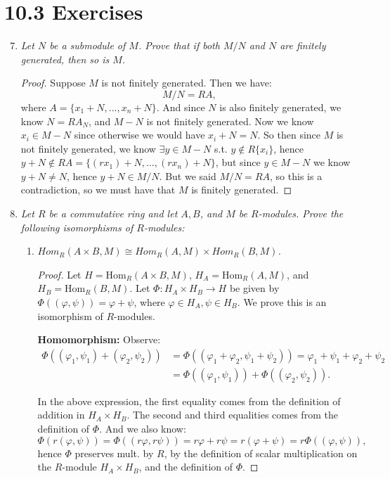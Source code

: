 \documentclass[9pt,reqno,twoside]{amsbook}
\theoremstyle{plain}
\numberwithin{section}{chapter}
\numberwithin{equation}{chapter}
\theoremstyle{definition}
\theoremstyle{remark}
\theoremstyle{plain}
\renewcommand{\phi}{\varphi}
\begin{document}
\section*{10.3 Exercises}
\begin{enumerate}[label=\arabic*.]
\setcounter{enumi}{6}
\item \textit{Let $N$ be a submodule of $M$. Prove that if both $M/N$ and $N$ are finitely generated, then so is $M$. }
\begin{proof}
Suppose $M$ is not finitely generated. Then we have:
$$
M/N = RA,
$$
where $A = \{x_1 + N,...,x_n + N\}$. And since $N$ is also finitely generated, we know $N = RA_N$, and $M -N$ is not finitely generated. 
Now we know $x_i \in M - N$ since otherwise we would have $x_i + N = N$. So then since $M$ is not finitely generated, we know $\exists y \in M - N$ s.t. $y \notin R\{x_i\}$, hence $y + N \notin RA = \{(rx_1) + N,...,(rx_n)+ N\}$, but since $y \in M - N$ we know $y + N \neq N$, hence $y + N \in M/N$. But we said $M/N = RA$, so this is a contradiction, so we must have that $M$ is finitely generated. 
\end{proof}

\setcounter{enumi}{11}
\item \textit{Let $R$ be a commutative ring and let $A,B$, and $M$ be $R$-modules. Prove the following isomorphisms of $R$-modules: }
\begin{enumerate}
\item \textit{$Hom_R(A\times B,M) \cong Hom_R(A,M) \times Hom_R(B,M)$.}
\begin{proof}
Let $H = \text{Hom}_R(A\times B,M)$, $H_A = \text{Hom}_R(A,M)$, and $H_B = \text{Hom}_R(B,M)$. Let $\Phi: H_A \times H_B\to H$ be given by $\Phi((\phi,\psi)) = \phi + \psi$, where $\phi \in H_A,\psi \in H_B$. We prove this is an isomorphism of $R$-modules. 

\textbf{Homomorphism: }Observe: 
\begin{equation}
\begin{aligned}
\Phi((\phi_1,\psi_1) + (\phi_2,\psi_2)) &= \Phi((\phi_1 + \phi_2,\psi_1 + \psi_2)) = \phi_1 + \psi_1 + \phi_2 + \psi_2\\ &= \Phi((\phi_1,\psi_1)) + \Phi((\phi_2,\psi_2)).
\end{aligned}
\end{equation}

In the above expression, the first equality comes from the definition of addition in $H_A \times H_B$. The second and third equalities comes from the definition of $\Phi$. And we also know: 
$$
\Phi(r(\phi,\psi)) = \Phi((r\phi,r\psi)) = r\phi + r\psi = r(\phi + \psi) = r\Phi((\phi,\psi)),
$$
hence $\Phi$ preserves mult. by $R$, by the definition of scalar multiplication on the $R$-module $H_A \times H_B$, and the definition of $\Phi$. 


\end{proof}
\end{enumerate}
\end{enumerate}
\end{document}
